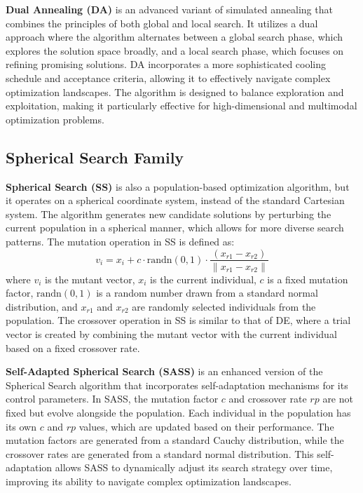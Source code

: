 \documentclass{article}
\begin{document}
\textbf{Dual Annealing (DA)} is an advanced variant of simulated annealing that combines the principles of both global and local search. It utilizes a dual approach where the algorithm alternates between a global search phase, which explores the solution space broadly, and a local search phase, which focuses on refining promising solutions. DA incorporates a more sophisticated cooling schedule and acceptance criteria, allowing it to effectively navigate complex optimization landscapes. The algorithm is designed to balance exploration and exploitation, making it particularly effective for high-dimensional and multimodal optimization problems.

\subsection*{Spherical Search Family}

\textbf{Spherical Search (SS)} is also a population-based optimization algorithm, but it operates on a spherical coordinate system, instead of the standard Cartesian system. The algorithm generates new candidate solutions by perturbing the current population in a spherical manner, which allows for more diverse search patterns. The mutation operation in SS is defined as:
\[v_{i} = x_{i} + c \cdot \text{randn}(0, 1) \cdot \frac{(x_{r1} - x_{r2})}{\|x_{r1} - x_{r2}\|}\]
where $v_i$ is the mutant vector, $x_i$ is the current individual, $c$ is a fixed mutation factor, $\text{randn}(0, 1)$ is a random number drawn from a standard normal distribution, and $x_{r1}$ and $x_{r2}$ are randomly selected individuals from the population. The crossover operation in SS is similar to that of DE, where a trial vector is created by combining the mutant vector with the current individual based on a fixed crossover rate.

\textbf{Self-Adapted Spherical Search (SASS)} is an enhanced version of the Spherical Search algorithm that incorporates self-adaptation mechanisms for its control parameters. In SASS, the mutation factor $c$ and crossover rate $rp$ are not fixed but evolve alongside the population. Each individual in the population has its own $c$ and $rp$ values, which are updated based on their performance. The mutation factors are generated from a standard Cauchy distribution, while the crossover rates are generated from a standard normal distribution. This self-adaptation allows SASS to dynamically adjust its search strategy over time, improving its ability to navigate complex optimization landscapes.
\end{document}
